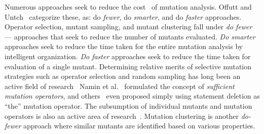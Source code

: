 Numerous approaches seek to reduce the cost~\cite{jia2011analysis} of mutation
analysis. Offutt and Untch~\cite{offutt2001mutation} categorize these,
as: do \textit{fewer}, do \textit{smarter}, and do \textit{faster} approaches.
Operator selection, mutant sampling, and mutant clustering fall under
\textit{do fewer} --- approaches that seek to reduce the number of mutants
evaluated.  \emph{Do smarter} approaches seek to reduce the time taken
for the entire mutation analysis by intelligent organization.
\textit{Do faster} approaches seek to
reduce the time taken for evaluation of a single mutant.%
Determining relative merits of selective mutation strategies such as operator
selection and random sampling has long been an active field of research~\cite{wong1995reducing,mresa1999efficiency,zhang2010isoperator}
Namin et al.~\cite{namin2006finding,namin2008sufficient} formulated the
concept of \emph{sufficient mutation operators}, and
others~\cite{untch2009onreduced, deng2013empirical} even proposed simply using statement
deletion as ``the'' mutation operator.  %
The subsumption of individual mutants and mutation operators is also an active
area of research~\cite{gopinath2016measuring,shin2016theoretical,lindstrom2015redundant}.
Mutation clustering\cite{derezinska2015toward,strug2012machine,hussain2008mutation} is another \emph{do-fewer}
approach where similar mutants are identified based on various
properties.

